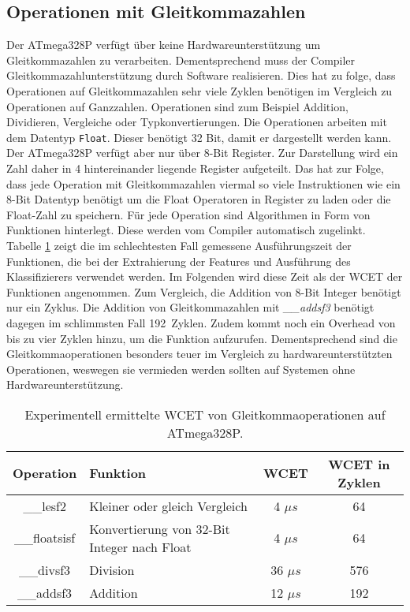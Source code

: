 \subsection{Operationen mit Gleitkommazahlen}
Der ATmega328P verfügt über keine Hardwareunterstützung um Gleitkommazahlen zu verarbeiten. Dementsprechend muss der Compiler Gleitkommazahlunterstützung durch Software realisieren. Dies hat zu folge, dass Operationen
auf Gleitkommazahlen sehr viele Zyklen benötigen im Vergleich zu Operationen auf Ganzzahlen. Operationen sind zum Beispiel Addition, Dividieren, Vergleiche oder Typkonvertierungen.
\newline
\newline
Die Operationen arbeiten mit dem Datentyp \texttt{Float}. Dieser benötigt 32 Bit, damit er dargestellt werden kann. Der ATmega328P verfügt aber nur über 8-Bit Register. Zur Darstellung wird ein Zahl daher in 4 hintereinander
liegende Register aufgeteilt. Das hat zur Folge, dass jede Operation mit Gleitkommazahlen viermal so viele Instruktionen wie ein 8-Bit Datentyp benötigt um die Float Operatoren in Register zu laden oder die
Float-Zahl zu speichern.
\newline
\newline
Für jede Operation sind Algorithmen in Form von Funktionen hinterlegt. Diese werden vom Compiler automatisch zugelinkt. Tabelle \ref{tab:float_operations} zeigt die im schlechtesten Fall gemessene Ausführungszeit
der Funktionen, die bei der Extrahierung der Features und Ausführung des Klassifizierers verwendet werden. Im Folgenden wird diese Zeit als der WCET der Funktionen angenommen.
Zum Vergleich, die Addition von 8-Bit Integer benötigt nur ein Zyklus. Die Addition von Gleitkommazahlen mit \textit{\_\_addsf3} benötigt dagegen im schlimmsten Fall 192~Zyklen. Zudem kommt noch ein
Overhead von bis zu vier Zyklen hinzu, um die Funktion aufzurufen. Dementsprechend sind die Gleitkommaoperationen besonders teuer im Vergleich zu hardwareunterstützten Operationen, weswegen sie vermieden
werden sollten auf Systemen ohne Hardwareunterstützung.
\begin{table}[h!]
    \centering
    \begin{tabular}{ | c | l | c | c |}
        \hline
        Operation & Funktion & WCET & WCET in Zyklen \\\hline
        \_\_lesf2 & Kleiner oder gleich Vergleich & 4 $\mu s$ & 64 \\\hline
        \_\_floatsisf & Konvertierung von 32-Bit Integer nach Float & 4 $\mu s$ & 64 \\\hline
        \_\_divsf3 & Division & 36 $\mu s$ & 576 \\\hline
        \_\_addsf3 & Addition & 12 $\mu s$ & 192 \\\hline
    \end{tabular}
    \caption{Experimentell ermittelte WCET von Gleitkommaoperationen auf ATmega328P.}
    \label{tab:float_operations}
\end{table}